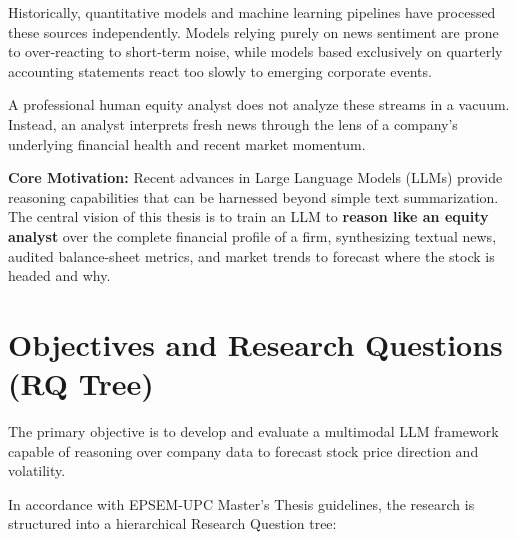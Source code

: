 \documentclass[11pt,a4paper]{article}
\begin{document}
Historically, quantitative models and machine learning pipelines have processed these sources independently. Models relying purely on news sentiment are prone to over-reacting to short-term noise, while models based exclusively on quarterly accounting statements react too slowly to emerging corporate events. 

A professional human equity analyst does not analyze these streams in a vacuum. Instead, an analyst interprets fresh news through the lens of a company's underlying financial health and recent market momentum. 

\textbf{Core Motivation:} Recent advances in Large Language Models (LLMs) provide reasoning capabilities that can be harnessed beyond simple text summarization. The central vision of this thesis is to train an LLM to \textbf{reason like an equity analyst} over the complete financial profile of a firm, synthesizing textual news, audited balance-sheet metrics, and market trends to forecast where the stock is headed and why.

\section{Objectives and Research Questions (RQ Tree)}
\label{sec:rq}

The primary objective is to develop and evaluate a multimodal LLM framework capable of reasoning over company data to forecast stock price direction and volatility.

In accordance with EPSEM-UPC Master's Thesis guidelines, the research is structured into a hierarchical Research Question tree:
\end{document}
